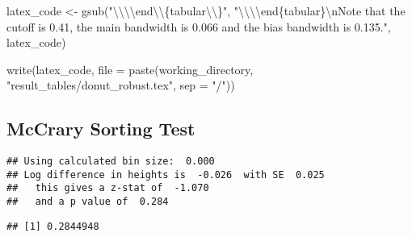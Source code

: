 \documentclass[
]{article}
\newenvironment{Shaded}{\begin{snugshade}}{\end{snugshade}}
\newcommand{\AttributeTok}[1]{\textcolor[rgb]{0.77,0.63,0.00}{#1}}
\newcommand{\CommentTok}[1]{\textcolor[rgb]{0.56,0.35,0.01}{\textit{#1}}}
\newcommand{\ConstantTok}[1]{\textcolor[rgb]{0.00,0.00,0.00}{#1}}
\newcommand{\FloatTok}[1]{\textcolor[rgb]{0.00,0.00,0.81}{#1}}
\newcommand{\FunctionTok}[1]{\textcolor[rgb]{0.00,0.00,0.00}{#1}}
\newcommand{\NormalTok}[1]{#1}
\newcommand{\OtherTok}[1]{\textcolor[rgb]{0.56,0.35,0.01}{#1}}
\newcommand{\SpecialCharTok}[1]{\textcolor[rgb]{0.00,0.00,0.00}{#1}}
\newcommand{\StringTok}[1]{\textcolor[rgb]{0.31,0.60,0.02}{#1}}
\begin{document}
\begin{Shaded}
\begin{Highlighting}[]
\NormalTok{latex\_code }\OtherTok{\textless{}{-}} \FunctionTok{gsub}\NormalTok{(}\StringTok{"}\SpecialCharTok{\textbackslash{}\textbackslash{}\textbackslash{}\textbackslash{}}\StringTok{end}\SpecialCharTok{\textbackslash{}\textbackslash{}}\StringTok{\{tabular}\SpecialCharTok{\textbackslash{}\textbackslash{}}\StringTok{\}"}\NormalTok{, }\StringTok{"}\SpecialCharTok{\textbackslash{}\textbackslash{}\textbackslash{}\textbackslash{}}\StringTok{end\{tabular\}}\SpecialCharTok{\textbackslash{}n}\StringTok{Note that the cutoff is 0.41, the main bandwidth is 0.066 and the bias bandwidth is 0.135."}\NormalTok{,}
\NormalTok{    latex\_code)}

\FunctionTok{write}\NormalTok{(latex\_code, }\AttributeTok{file =} \FunctionTok{paste}\NormalTok{(working\_directory, }\StringTok{"result\_tables/donut\_robust.tex"}\NormalTok{,}
    \AttributeTok{sep =} \StringTok{"/"}\NormalTok{))}
\end{Highlighting}
\end{Shaded}

\hypertarget{mccrary-sorting-test}{%
\subsection{McCrary Sorting Test}\label{mccrary-sorting-test}}

\begin{Shaded}
\end{Shaded}

\begin{verbatim}
## Using calculated bin size:  0.000 
## Log difference in heights is  -0.026  with SE  0.025 
##   this gives a z-stat of  -1.070 
##   and a p value of  0.284
\end{verbatim}

\begin{verbatim}
## [1] 0.2844948
\end{verbatim}
\end{document}
